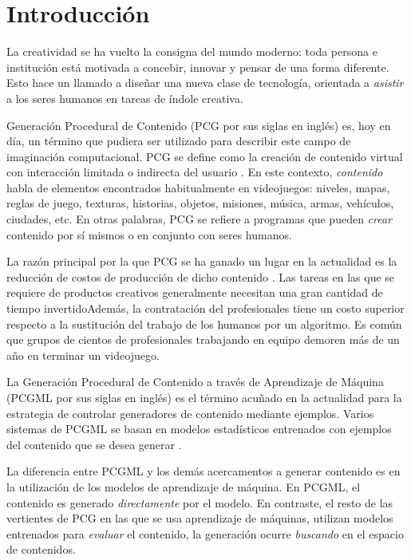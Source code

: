 \chapter*{Introducción}\label{chapter:introduction}

La creatividad se ha vuelto la consigna del mundo moderno: toda persona e institución
está motivada a concebir, innovar y pensar de una forma diferente. 
Esto hace un llamado a diseñar una nueva clase de tecnología, orientada a
\textit{asistir} a los seres humanos en tareas de índole creativa.

Generación Procedural de Contenido (PCG por sus siglas en inglés)
es, hoy en día, un término que pudiera ser utilizado para describir este campo de imaginación
computacional. PCG se define como la creación de contenido virtual con interacción
limitada o indirecta del usuario \cite{bib:5}. En este contexto, \textit{contenido} habla
de elementos encontrados habitualmente en videojuegos: niveles, mapas,
reglas de juego, texturas, historias, objetos, misiones, música,
armas, vehículos, ciudades, etc. En otras palabras, PCG se refiere
a programas que pueden \textit{crear} contenido por sí mismos
o en conjunto con seres humanos. 

La razón principal por la que PCG se ha ganado un lugar en la actualidad
es la reducción de costos de producción de dicho contenido \cite{bib:11}. Las tareas en las que se
requiere de productos creativos generalmente necesitan
una gran cantidad de tiempo invertidoAdemás, la contratación del profesionales
tiene un costo superior respecto a la sustitución del trabajo de los humanos por un algoritmo.
Es común que grupos de cientos
de profesionales trabajando en equipo demoren más de un año en terminar un videojuego.

La Generación Procedural de Contenido a través de Aprendizaje de Máquina (PCGML por sus siglas en inglés)
es el término acuñado en la actualidad para la estrategia de controlar
generadores de contenido mediante ejemplos. Varios sistemas
de PCGML se basan en modelos estadísticos entrenados con ejemplos
del contenido que se desea generar \cite{bib:1}. 

La diferencia entre PCGML y los demás acercamentos a 
generar contenido es en la utilización de los modelos
de aprendizaje de máquina.
En PCGML, el contenido es generado \textit{directamente} por el modelo.
En contraste, el resto de las vertientes de PCG en las que se usa
aprendizaje de máquinas, utilizan modelos
entrenados para \textit{evaluar} el contenido, la generación
ocurre \textit{buscando} en el espacio de contenidos.

